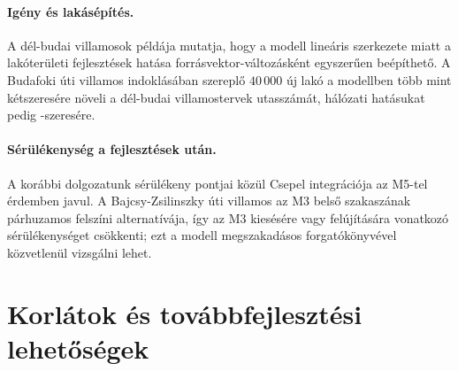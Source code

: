 \documentclass[12pt,a4paper]{article}
\theoremstyle{definition}
\theoremstyle{remark}
\begin{document}
\paragraph{Igény és lakásépítés.}
A dél-budai villamosok példája mutatja, hogy a modell lineáris szerkezete
miatt a lakóterületi fejlesztések hatása forrásvektor-változásként egyszerűen
beépíthető. A Budafoki úti villamos indoklásában szereplő $40\,000$ új lakó
a modellben több mint kétszeresére növeli a dél-budai villamostervek
utasszámát, hálózati hatásukat pedig \DEMGRATIO-szeresére.

\paragraph{Sérülékenység a fejlesztések után.}
A korábbi dolgozatunk sérülékeny pontjai közül Csepel integrációja az M5-tel
érdemben javul. A Bajcsy-Zsilinszky úti villamos az M3 belső szakaszának
párhuzamos felszíni alternatívája, így az M3 kiesésére vagy felújítására
vonatkozó sérülékenységet csökkenti; ezt a modell megszakadásos
forgatókönyvével közvetlenül vizsgálni lehet.

\section{Korlátok és továbbfejlesztési lehetőségek}
\label{sec:korlat}
\end{document}
